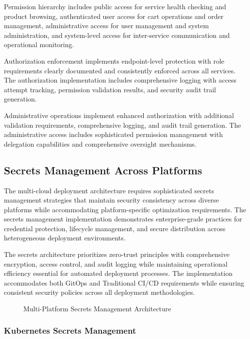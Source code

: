 Permission hierarchy includes public access for service health checking and product browsing, authenticated user access for cart operations and order management, administrative access for user management and system administration, and system-level access for inter-service communication and operational monitoring.

Authorization enforcement implements endpoint-level protection with role requirements clearly documented and consistently enforced across all services. The authorization implementation includes comprehensive logging with access attempt tracking, permission validation results, and security audit trail generation.

Administrative operations implement enhanced authorization with additional validation requirements, comprehensive logging, and audit trail generation. The administrative access includes sophisticated permission management with delegation capabilities and comprehensive oversight mechanisms.

\subsection{Secrets Management Across Platforms}

The multi-cloud deployment architecture requires sophisticated secrets management strategies that maintain security consistency across diverse platforms while accommodating platform-specific optimization requirements. The secrets management implementation demonstrates enterprise-grade practices for credential protection, lifecycle management, and secure distribution across heterogeneous deployment environments.

The secrets architecture prioritizes zero-trust principles with comprehensive encryption, access control, and audit logging while maintaining operational efficiency essential for automated deployment processes. The implementation accommodates both GitOps and Traditional CI/CD requirements while ensuring consistent security policies across all deployment methodologies.

\begin{figure}[H]
\centering
\caption{Multi-Platform Secrets Management Architecture}
\label{fig:secrets-management-architecture}
\end{figure}

\subsubsection{Kubernetes Secrets Management}

